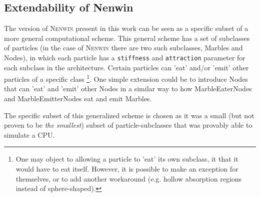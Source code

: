 \subsection{Extendability of Nenwin}
The version of \textsc{Nenwin} present in this work can be seen as a specific subset of a more general computational scheme. This general scheme has a set of subclasses of particles (in the case of \textsc{Nenwin} there are two such subclasses, Marbles and Nodes), in which each particle has a \texttt{stiffness} and \texttt{attraction} parameter for each subclass in the architecture. Certain particles can 'eat' and/or 'emit' other particles of a specific class \footnote{One may object to allowing a particle to 'eat' its own subclass, it that it would have to eat itself. However, it is possible to make an exception for themselves, or to add another workaround (e.g. hollow absorption regions instead of sphere-shaped).}. One simple extension could be to introduce Nodes that can 'eat' and 'emit' other Nodes in a similar way to how MarbleEaterNodes and MarbleEmitterNodes eat and emit Marbles.

The specific subset of this generalized scheme is chosen as it was a small (but not proven to be \textit{the smallest}) subset of particle-subclasses that was provably able to simulate a CPU.